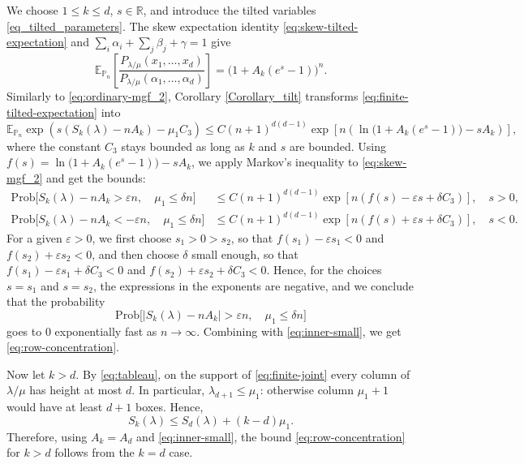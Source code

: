 \documentclass[11pt,reqno]{amsart}
\theoremstyle{definition}
\theoremstyle{remark}
\numberwithin{equation}{section}
\newcommand{\Prob}{\mathbb P}
\newcommand{\E}{\mathbb E}
\newcommand{\eps}{\varepsilon}
\begin{document}
We choose $1\le k\le d$, $s\in\mathbb R$, and introduce the tilted variables \eqref{eq_tilted_parameters}. The skew expectation identity \eqref{eq:skew-tilted-expectation} and $\sum_i\alpha_i+\sum_j\beta_j+\gamma=1$ give
\begin{equation}\label{eq:finite-tilted-expectation}
 \E_{\Prob_n}\left[\frac{P_{\lambda/\mu}(x_1,\dots,x_d)}{P_{\lambda/\mu}(\alpha_1,\dots,\alpha_d)}\right]=\bigl(1+A_k(e^s-1)\bigr)^n.
\end{equation}
Similarly to \eqref{eq:ordinary-mgf_2}, Corollary \ref{Corollary_tilt} transforms \eqref{eq:finite-tilted-expectation} into
\begin{equation}\label{eq:skew-mgf_2}
 \E_{\Prob_n}\exp\left(s(S_k(\lambda)-nA_k)-\mu_1 C_3\right)
 \le
 C(n+1)^{d(d-1)} \exp\left[n\left(\ln\bigl(1+A_k(e^s-1) \bigr) -sA_k\right)\right],
\end{equation}
where the constant $C_3$ stays bounded as long as $k$ and $s$ are bounded. Using $f(s)=\ln\bigl(1+A_k(e^s-1) \bigr) -sA_k$, we apply Markov's inequality to \eqref{eq:skew-mgf_2} and get the bounds:
\begin{align*}
 \mathrm{Prob}\bigl[S_k(\lambda)-nA_k>\eps n, \quad \mu_1\le \delta n\bigr]&\le  C(n+1)^{d(d-1)} \exp\left[n\left(f(s)-\eps s+\delta C_3\right)\right], \quad s>0,\\
 \mathrm{Prob}\bigl[S_k(\lambda)-nA_k<-\eps n, \quad \mu_1\le \delta n\bigr]&\le  C(n+1)^{d(d-1)} \exp\left[n\left(f(s)+\eps s+\delta C_3\right)\right], \quad s<0.
\end{align*}
For a given $\eps>0$, we first choose $s_1>0>s_2$, so that $f(s_1)-\eps s_1<0$ and $f(s_2)+\eps s_2<0$, and then choose $\delta$ small enough, so that $f(s_1)-\eps s_1+\delta C_3<0$ and $f(s_2)+\eps s_2+\delta C_3<0$. Hence, for the choices $s=s_1$ and $s=s_2$, the expressions in the exponents are negative, and we conclude that the probability
$$
  \mathrm{Prob}\bigl[ \bigl|S_k(\lambda)-nA_k\bigr|>\eps n, \quad \mu_1\le \delta n\bigr]
$$
goes to $0$ exponentially fast as $n\to\infty$. Combining with \eqref{eq:inner-small}, we get \eqref{eq:row-concentration}.


Now let $k>d$. By \eqref{eq:tableau}, on the support of \eqref{eq:finite-joint} every column
of $\lambda/\mu$ has height at most $d$. In particular,
$\lambda_{d+1}\le\mu_1$: otherwise column $\mu_1+1$ would have at least
$d+1$ boxes. Hence,
\[
 S_k(\lambda)\le S_d(\lambda)+(k-d)\mu_1.
\]
Therefore, using $A_k=A_d$ and \eqref{eq:inner-small}, the bound \eqref{eq:row-concentration} for $k>d$ follows from the $k=d$ case.
\end{document}
